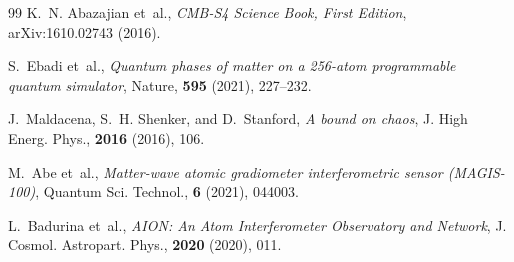 \documentclass[aps,prl,reprint,twocolumn,superscriptaddress,nofootinbib,floatfix]{revtex4-2}
\begin{document}
\begin{thebibliography}{99}
K.~N. Abazajian et~al.,
\emph{CMB-S4 Science Book, First Edition},
arXiv:1610.02743 (2016).

S.~Ebadi et~al.,
\emph{Quantum phases of matter on a 256-atom programmable quantum simulator},
Nature, \textbf{595} (2021), 227--232.

J.~Maldacena, S.~H. Shenker, and D.~Stanford,
\emph{A bound on chaos},
J. High Energ. Phys., \textbf{2016} (2016), 106.

M.~Abe et~al.,
\emph{Matter-wave atomic gradiometer interferometric sensor (MAGIS-100)},
Quantum Sci. Technol., \textbf{6} (2021), 044003.

L.~Badurina et~al.,
\emph{AION: An Atom Interferometer Observatory and Network},
J. Cosmol. Astropart. Phys., \textbf{2020} (2020), 011.

\end{thebibliography}
\end{document}
